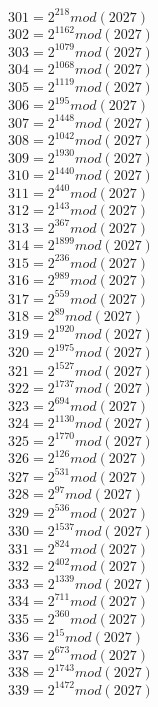 \documentclass[12pt, letterpaper]{article}
\begin{document}
\begin{itemize}
\begin{multicols}{3}
$301= 2^{218} mod (2027)$\\
$302= 2^{1162} mod (2027)$\\
$303= 2^{1079} mod (2027)$\\
$304= 2^{1068} mod (2027)$\\
$305= 2^{1119} mod (2027)$\\
$306= 2^{195} mod (2027)$\\
$307= 2^{1448} mod (2027)$\\
$308= 2^{1042} mod (2027)$\\
$309= 2^{1930} mod (2027)$\\
$310= 2^{1440} mod (2027)$\\
$311= 2^{440} mod (2027)$\\
$312= 2^{143} mod (2027)$\\
$313= 2^{367} mod (2027)$\\
$314= 2^{1899} mod (2027)$\\
$315= 2^{236} mod (2027)$\\
$316= 2^{989} mod (2027)$\\
$317= 2^{559} mod (2027)$\\
$318= 2^{89} mod (2027)$\\
$319= 2^{1920} mod (2027)$\\
$320= 2^{1975} mod (2027)$\\
$321= 2^{1527} mod (2027)$\\
$322= 2^{1737} mod (2027)$\\
$323= 2^{694} mod (2027)$\\
$324= 2^{1130} mod (2027)$\\
$325= 2^{1770} mod (2027)$\\
$326= 2^{126} mod (2027)$\\
$327= 2^{531} mod (2027)$\\
$328= 2^{97} mod (2027)$\\
$329= 2^{536} mod (2027)$\\
$330= 2^{1537} mod (2027)$\\
$331= 2^{824} mod (2027)$\\
$332= 2^{402} mod (2027)$\\
$333= 2^{1339} mod (2027)$\\
$334= 2^{711} mod (2027)$\\
$335= 2^{360} mod (2027)$\\
$336= 2^{15} mod (2027)$\\
$337= 2^{673} mod (2027)$\\
$338= 2^{1743} mod (2027)$\\
$339= 2^{1472} mod (2027)$\\

\end{multicols}
\end{itemize}
\end{document}
